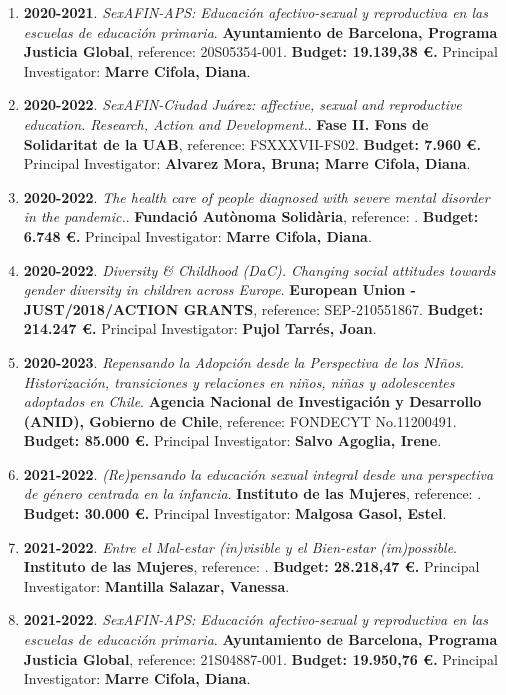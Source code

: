 \begin{enumerate}
\item {\bf 2020-2021}. {\it SexAFIN-APS: Educación afectivo-sexual y reproductiva en las escuelas de educación primaria}. {\bf Ayuntamiento de Barcelona, Programa Justicia Global},  reference: 20S05354-001. {\bf  Budget: 19.139,38 €.} Principal Investigator: {\bf Marre Cifola, Diana}.\filbreak
\item {\bf 2020-2022}. {\it SexAFIN-Ciudad Juárez: affective, sexual and reproductive education. Research, Action and Development.}. {\bf Fase II. Fons de Solidaritat de la UAB},  reference: FSXXXVII-FS02. {\bf  Budget: 7.960 €.} Principal Investigator: {\bf Alvarez Mora, Bruna; Marre Cifola, Diana}.\filbreak
\item {\bf 2020-2022}. {\it The health care of people diagnosed with severe mental disorder in the pandemic.}. {\bf Fundació Autònoma Solidària},  reference: . {\bf  Budget: 6.748 €.} Principal Investigator: {\bf Marre Cifola, Diana}.\filbreak
\item {\bf 2020-2022}. {\it Diversity \& Childhood  (DaC). Changing social attitudes towards gender diversity in children across Europe}. {\bf European Union - JUST/2018/ACTION GRANTS},  reference: SEP-210551867. {\bf  Budget: 214.247 €.} Principal Investigator: {\bf Pujol Tarrés, Joan}.\filbreak
\item {\bf 2020-2023}. {\it Repensando la Adopción desde la Perspectiva de los NIños. Historización, transiciones y relaciones en niños, niñas y adolescentes adoptados en Chile}. {\bf Agencia Nacional de Investigación y Desarrollo (ANID), Gobierno de Chile},  reference: FONDECYT No.11200491. {\bf  Budget: 85.000 €.} Principal Investigator: {\bf Salvo Agoglia, Irene}.\filbreak
\item {\bf 2021-2022}. {\it (Re)pensando la educación sexual integral desde una perspectiva de género centrada en la infancia}. {\bf Instituto de las Mujeres},  reference: . {\bf  Budget: 30.000 €.} Principal Investigator: {\bf Malgosa Gasol, Estel}.\filbreak
\item {\bf 2021-2022}. {\it Entre el Mal-estar (in)visible y el Bien-estar (im)possible}. {\bf Instituto de las Mujeres},  reference: . {\bf  Budget: 28.218,47 €.} Principal Investigator: {\bf Mantilla Salazar, Vanessa}.\filbreak
\item {\bf 2021-2022}. {\it SexAFIN-APS: Educación afectivo-sexual y reproductiva en las escuelas de educación primaria}. {\bf Ayuntamiento de Barcelona, Programa Justicia Global},  reference: 21S04887-001. {\bf  Budget: 19.950,76 €.} Principal Investigator: {\bf Marre Cifola, Diana}.\filbreak

\end{enumerate}
